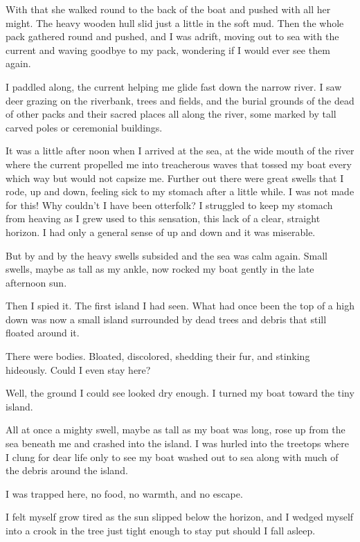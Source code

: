 With that she walked round to the back of the boat and pushed with all her might. The heavy wooden hull slid just a little in the soft mud. Then the whole pack gathered round and pushed, and I was adrift, moving out to sea with the current and waving goodbye to my pack, wondering if I would ever see them again.

I paddled along, the current helping me glide fast down the narrow river. I saw deer grazing on the riverbank, trees and fields, and the burial grounds of the dead of other packs and their sacred places all along the river, some marked by tall carved poles or ceremonial buildings.

It was a little after noon when I arrived at the sea, at the wide mouth of the river where the current propelled me into treacherous waves that tossed my boat every which way but would not capsize me. Further out there were great swells that I rode, up and down, feeling sick to my stomach after a little while. I was not made for this! Why couldn't I have been otterfolk? I struggled to keep my stomach from heaving as I grew used to this sensation, this lack of a clear, straight horizon. I had only a general sense of up and down and it was miserable.

But by and by the heavy swells subsided and the sea was calm again. Small swells, maybe as tall as my ankle, now rocked my boat gently in the late afternoon sun.

Then I spied it. The first island I had seen. What had once been the top of a high down was now a small island surrounded by dead trees and debris that still floated around it.

There were bodies. Bloated, discolored, shedding their fur, and stinking hideously. Could I even stay here?

Well, the ground I could see looked dry enough. I turned my boat toward the tiny island.

All at once a mighty swell, maybe as tall as my boat was long, rose up from the sea beneath me and crashed into the island. I was hurled into the treetops where I clung for dear life only to see my boat washed out to sea along with much of the debris around the island.

I was trapped here, no food, no warmth, and no escape.

\secdiv

I felt myself grow tired as the sun slipped below the horizon, and I wedged myself into a crook in the tree just tight enough to stay put should I fall asleep.

